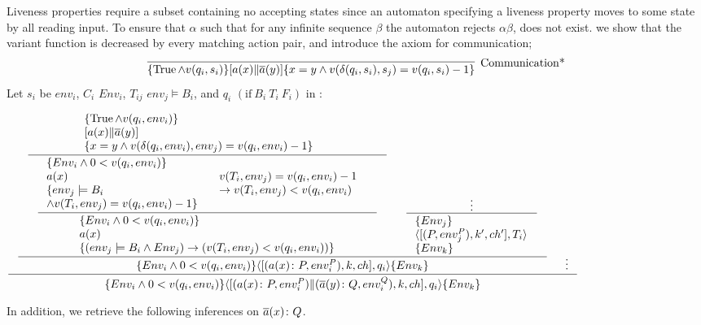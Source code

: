 \documentclass[12pt,a4paper,titlepage]{article}
\theoremstyle{break}
\begin{document}
Liveness properties require a subset containing no accepting states since an automaton specifying a liveness property moves to some state by all reading input.
To ensure that \(\alpha\) such that for any infinite sequence \(\beta\) the automaton rejects \(\alpha\beta\), does not exist.
we show that the variant function is decreased by every matching action pair, 
and introduce the axiom for communication;
  \begin{displaymath}
\infer[\mbox{Communication*}]
      {\{\Truerm\wedge v(q_i,s_i)\}[a(x)\|\bijection{a}(y)]\{x=y\wedge v(\delta(q_i,s_i),s_j)=v(q_i,s_i)-1\}}
      {}
  \end{displaymath}
Let \(s_i\) be \(env_i\), \(C_i\) \(Env_i\), \(T_{ij}\) \(env_j\models B_i\), and \(q_i\) \((\mbox{if}\ B_i\ T_i\ F_i)\) in \NHK:
  \begin{center}
    \begin{math}
\inference{
  \inference{
    \inference{\parbox{76mm}{\(\{\Truerm\wedge v(q_i,env_i)\}\)\\\([a(x)\|\bijection{a}(y)]\)\\
                             \(\{x=y\wedge v(\delta(q_i,env_i),env_j)=v(q_i,env_i)-1\}\)}}
    {\inference{\parbox{48mm}{\(\{Env_i\wedge 0<v(q_i,env_i)\}\)\\
                             \(a(x)\)\\
                             \(\{env_j\models B_i\)\\\(\wedge v(T_i,env_j)=v(q_i,env_i)-1\}\)}&
                  \parbox{46mm}{\(v(T_i,env_j)=v(q_i,env_i)-1\)\\\(->v(T_i,env_j)<v(q_i,env_i)\)}}
               {\parbox{79mm}{\(\{Env_i\wedge 0<v(q_i,env_i)\}\)\\\(a(x)\)\\\(\{(env_j\models B_i\wedge Env_j)->(v(T_i,env_j)<v(q_i,env_i))\}\)}}}&
     \inference{\vdots}
     {\parbox{35mm}{\(\{Env_j\}\)\\
                   \(\langle[(P,env_j^P),k',ch'],T_i\rangle\)\\
                   \(\{Env_k\}\)}}}
  {\{Env_i\wedge 0<v(q_i,env_i)\}\langle[(a(x)\colon P,env_i^P),k,ch],q_i\rangle\{Env_k\}}&\vdots}
{\{Env_i\wedge 0<v(q_i,env_i)\}\langle[(a(x)\colon P,env_i^P)\|(\bijection{a}(y)\colon Q,env_i^Q),k,ch],q_i\rangle\{Env_k\}}
    \end{math}
  \end{center}
In addition, we retrieve the following inferences on \(\mbox{$\overline{a}$}(x)\colon Q\).
\end{document}
